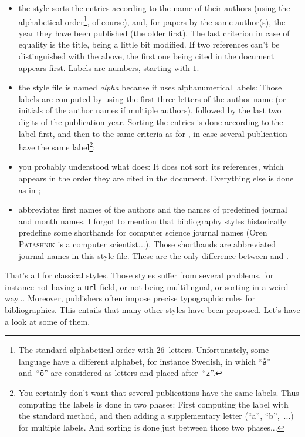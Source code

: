 \begin{itemize}
\item the  style sorts the entries according to the name of
  their authors (using the alphabetical order\footnote{The standard 
alphabetical order with $26$~letters. Unfortunately, some language 
have a different alphabet, for instance Swedish, in which 
``\texttt{\aa}'' and~``\texttt{\"o}'' are considered as letters and placed 
after~``\texttt{z}''.}, of course), and, for
  papers by the same author(s), the year they have been published 
(the
  older first). The last criterion in case of equality is the title,
  being a little bit modified. If two references can't be
  distinguished with the above, the first one being cited in the
  document appears first. Labels are numbers,
  starting with $1$. 

\item the  style file is named \emph{alpha} because it uses
  alphanumerical labels: Those labels are computed by \bt using the
  first three letters of the author name 
  (or initials of the author names
  if multiple authors), followed by the last two digits of the
  publication year. Sorting the entries is done according to the label
  first, and then to the same criteria as for , 
  in case several
  publication have the same label\footnote{You certainly don't want
  that several publications have the same labels. Thus computing the
  labels is done in two phases: First computing the label with the
  standard method, and then adding a supplementary letter (``a'',
  ``b'',~...) for multiple labels. And sorting is done just between
  those two phases...};
\item  you probably understood what  does: 
It does not sort
  its references, which appears in the order they are cited in the
  document. Everything else is done as in ;
\item {} abbreviates first names
 of the authors and the names of predefined journal and month names.
I forgot to mention that bibliography styles historically
 predefine some shorthands for computer science journal names (Oren
 \textsc{Patashnik} is a computer scientist...). Those shorthands are
 abbreviated journal names in this style file. These are the only
 difference between  and .
\end{itemize}


That's all for classical styles. Those styles suffer from several
problems, for instance not having a \texttt{url} field, or not being
multilingual, or sorting in a weird way... Moreover, publishers 
often impose  precise
typographic rules for bibliographies. This entails that many other
styles have been proposed. Let's have a look at some of them.




